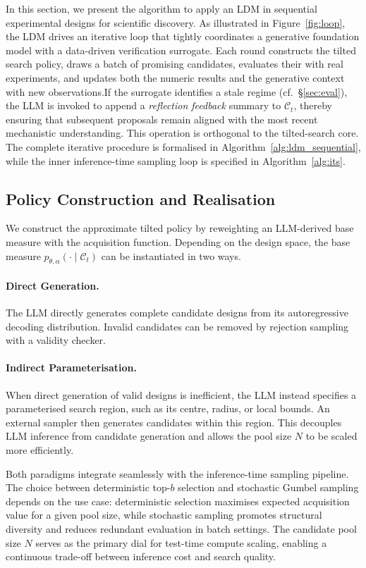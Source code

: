 In this section, we present the algorithm to apply an LDM in sequential experimental designs for scientific discovery. As illustrated in Figure~\ref{fig:loop}, the LDM drives an iterative loop that tightly coordinates a generative foundation model with a data-driven verification surrogate. Each round constructs the tilted search policy, draws a batch of promising candidates, evaluates their with real experiments, and updates both the numeric results and the generative context with new observations.If the surrogate identifies a stale regime (cf.\ \S\ref{sec:eval}), the LLM is invoked to append a \emph{reflection feedback} summary to $\mathcal{C}_t$, thereby ensuring that subsequent proposals remain aligned with the most recent mechanistic understanding. This operation is orthogonal to the tilted-search core. The complete iterative procedure is formalised in Algorithm~\ref{alg:ldm_sequential}, while the inner inference-time sampling loop is specified in Algorithm~\ref{alg:its}.

\subsection{Policy Construction and Realisation}

We construct the approximate tilted policy by reweighting an LLM-derived base measure with the acquisition function. Depending on the design space, the base measure $p_{\theta,\alpha}(\cdot \mid \mathcal{C}_t)$ can be instantiated in two ways.
\paragraph{Direct Generation.} The LLM directly generates complete candidate designs from its autoregressive decoding distribution. Invalid candidates can be removed by rejection sampling with a validity checker.
\paragraph{Indirect Parameterisation.} When direct generation of valid designs is inefficient, the LLM instead specifies a parameterised search region, such as its centre, radius, or local bounds. An external sampler then generates candidates within this region. This decouples LLM inference from candidate generation and allows the pool size $N$ to be scaled more efficiently.

Both paradigms integrate seamlessly with the inference-time sampling pipeline. The choice between deterministic top-$b$ selection and stochastic Gumbel sampling depends on the use case: deterministic selection maximises expected acquisition value for a given pool size, while stochastic sampling promotes structural diversity and reduces redundant evaluation in batch settings. The candidate pool size $N$ serves as the primary dial for test-time compute scaling, enabling a continuous trade-off between inference cost and search quality.

